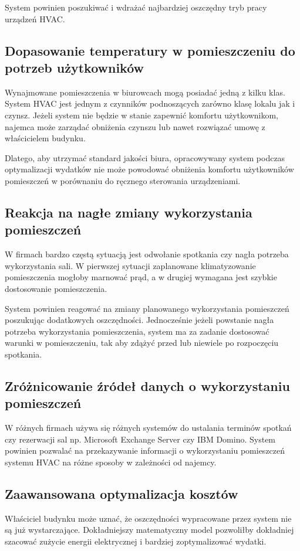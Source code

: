 System powinien poszukiwać i wdrażać najbardziej oszczędny tryb pracy urządzeń HVAC.

\subsection*{Dopasowanie temperatury w pomieszczeniu do potrzeb użytkowników} 
Wynajmowane pomieszczenia w biurowcach mogą posiadać jedną z kilku klas. \cite{bib:klasyBudynkow} 
System HVAC jest jednym z czynników podnoszących zarówno klasę lokalu jak i czynsz. 
Jeżeli system nie będzie w stanie zapewnić komfortu użytkownikom, najemca może zarządać obniżenia czynszu lub nawet rozwiązać umowę z właścicielem budynku. 

Dlatego, aby utrzymać standard jakości biura, opracowywany system podczas optymalizacji wydatków nie może powodować obniżenia komfortu użytkowników pomieszczeń w porównaniu do ręcznego sterowania urządzeniami.

\subsection*{Reakcja na nagłe zmiany wykorzystania pomieszczeń}
W firmach bardzo częstą sytuacją jest odwołanie spotkania czy nagła potrzeba wykorzystania sali.
W pierwszej sytuacji zaplanowane klimatyzowanie pomieszczenia mogłoby marnować prąd, a w drugiej wymagana jest szybkie dostosowanie pomieszczenia.

System powinien reagować na zmiany planowanego wykorzystania pomieszczeń poszukując dodatkowych oszczędności. 
Jednocześnie jeżeli powstanie nagła potrzeba wykorzystania pomieszczenia, system ma za zadanie dostosować warunki w pomieszczeniu, tak aby zdążyć przed lub niewiele po rozpoczęciu spotkania.   

\subsection*{Zróżnicowanie źródeł danych o wykorzystaniu pomieszczeń}
W różnych firmach używa się różnych systemów do ustalania terminów spotkań czy rezerwacji sal np. Microsoft Exchange Server czy IBM Domino.
System powinien pozwalać na przekazywanie informacji o wykorzystaniu pomieszczeń systemu HVAC na różne sposoby w zależności od najemcy.

\subsection*{Zaawansowana optymalizacja kosztów}
Właściciel budynku może uznać, że oszczędności wypracowane przez system nie są już wystarczające. 
Dokładniejszy matematyczny model pozwoliłby dokładniej szacować zużycie energii elektrycznej i bardziej zoptymalizować wydatki. 

